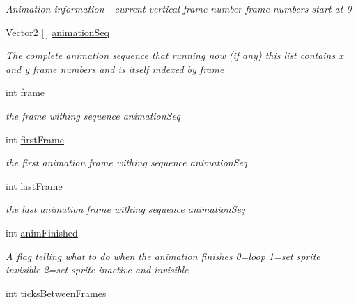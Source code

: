 \begin{DoxyCompactItemize}
\begin{DoxyCompactList}\small\item\em Animation information -\/ current vertical frame number frame numbers start at 0 \end{DoxyCompactList}\item 
Vector2 \mbox{[}$\,$\mbox{]} \mbox{\hyperlink{class_r_c___framework_1_1_sprite3_ae5664f646ee00d658a5d3087c78e9c8b}{animation\+Seq}}
\begin{DoxyCompactList}\small\item\em The complete animation sequence that running now (if any) this list contains x and y frame numbers and is itself indexed by frame \end{DoxyCompactList}\item 
int \mbox{\hyperlink{class_r_c___framework_1_1_sprite3_a51a88ce97928314b06f83ce2ab6cd04f}{frame}}
\begin{DoxyCompactList}\small\item\em the frame withing sequence \textquotesingle{}animation\+Seq\textquotesingle{} \end{DoxyCompactList}\item 
int \mbox{\hyperlink{class_r_c___framework_1_1_sprite3_a2ea65f55b021e3ce841161c43f4f7f9b}{first\+Frame}}
\begin{DoxyCompactList}\small\item\em the first animation frame withing sequence \textquotesingle{}animation\+Seq\textquotesingle{} \end{DoxyCompactList}\item 
int \mbox{\hyperlink{class_r_c___framework_1_1_sprite3_afc5ff18b8c0a0c4b8bb686270e0157c1}{last\+Frame}}
\begin{DoxyCompactList}\small\item\em the last animation frame withing sequence \textquotesingle{}animation\+Seq\textquotesingle{} \end{DoxyCompactList}\item 
int \mbox{\hyperlink{class_r_c___framework_1_1_sprite3_adcc42561b39149028339909953eabe4a}{anim\+Finished}}
\begin{DoxyCompactList}\small\item\em A flag telling what to do when the animation finishes 0=loop 1=set sprite invisible 2=set sprite inactive and invisible \end{DoxyCompactList}\item 
int \mbox{\hyperlink{class_r_c___framework_1_1_sprite3_a16c0418616359c95be16c9946db1fc23}{ticks\+Between\+Frames}}

\end{DoxyCompactItemize}
